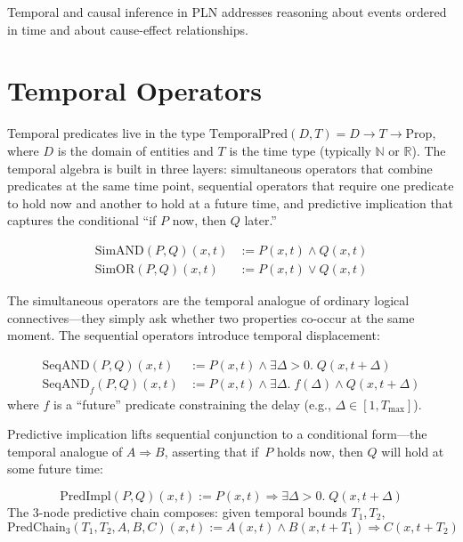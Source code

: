 \documentclass[11pt,openany]{report}
\begin{document}
Temporal and causal inference in PLN addresses reasoning about events
ordered in time and about cause-effect relationships.

\section{Temporal Operators}

Temporal predicates live in the type
$\mathrm{TemporalPred}(D, T) = D \to T \to \mathrm{Prop}$,
where $D$ is the domain of entities and $T$ is the time type (typically
$\mathbb{N}$ or $\mathbb{R}$).  The temporal algebra is built in three
layers: simultaneous operators that combine predicates at the same time
point, sequential operators that require one predicate to hold now and
another to hold at a future time, and predictive implication that captures
the conditional ``if $P$ now, then $Q$ later.''

\begin{definition}
\begin{align}
  \mathrm{SimAND}(P, Q)(x, t) &:= P(x, t) \wedge Q(x, t) \\
  \mathrm{SimOR}(P, Q)(x, t)  &:= P(x, t) \vee Q(x, t)
\end{align}
\end{definition}

The simultaneous operators are the temporal analogue of ordinary logical
connectives---they simply ask whether two properties co-occur at the same
moment.  The sequential operators introduce temporal displacement:

\begin{definition}
\begin{align}
  \mathrm{SeqAND}(P, Q)(x, t) &:= P(x, t) \wedge \exists \Delta > 0.\; Q(x, t + \Delta) \\
  \mathrm{SeqAND}_f(P, Q)(x, t) &:= P(x, t) \wedge \exists \Delta.\;
    f(\Delta) \wedge Q(x, t + \Delta)
\end{align}
where $f$ is a ``future'' predicate constraining the delay (e.g.,
$\Delta \in [1, T_{\max}]$).
\end{definition}

Predictive implication lifts sequential conjunction to a conditional
form---the temporal analogue of $A \Rightarrow B$, asserting that if~$P$
holds now, then $Q$ will hold at some future time:

\begin{definition}
\[
  \mathrm{PredImpl}(P, Q)(x, t) := P(x, t) \Rightarrow \exists \Delta > 0.\; Q(x, t + \Delta)
\]
The 3-node predictive chain composes: given temporal bounds $T_1, T_2$,
\[
  \mathrm{PredChain}_3(T_1, T_2, A, B, C)(x, t) :=
  A(x, t) \wedge B(x, t + T_1) \Rightarrow C(x, t + T_2)
\]
\end{definition}
\end{document}
